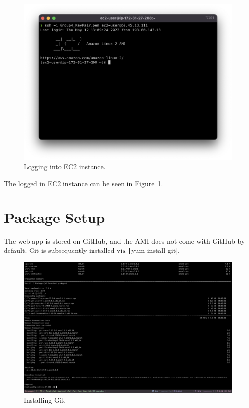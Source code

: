 \begin{figure}[!htbp]
    \centering
    \includegraphics[width=\textwidth]{resources/ec2/ec2-logged-in}
    \caption{Logging into EC2 instance.}
    \label{fig:ec2-logged-in}
\end{figure}

The logged in EC2 instance can be seen in Figure~\ref{fig:ec2-logged-in}.

\clearpage
\section{Package Setup}\label{sec:web-app-setup}

The web app is stored on GitHub, and the AMI does not come with GitHub by default.
Git is subsequently installed via \texttt|yum install git|.

\begin{figure}[!htbp]
    \centering
    \includegraphics[width=140mm]{resources/ec2/installing-git}
    \caption{Installing Git.}
    \label{fig:webapp-git}
\end{figure}

